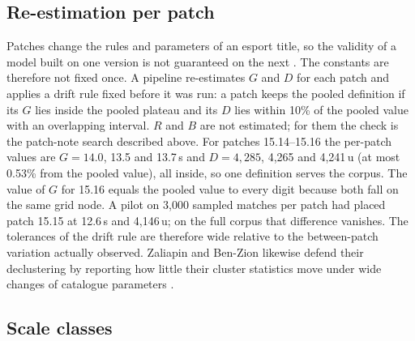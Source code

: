 \subsection{Re-estimation per patch}

Patches change the rules and parameters of an esport title, so the validity of a model built on one
version is not guaranteed on the next \cite{chitayat2023beyond}. The constants are therefore not fixed
once.
A pipeline re-estimates $G$ and $D$ for each patch and applies a drift rule fixed before it was run: a patch keeps the pooled definition if its
$G$ lies inside the pooled plateau and its $D$ lies within 10\% of the pooled value with an overlapping
interval.
$R$ and $B$ are not estimated; for them the check is the patch-note search described above. For patches
15.14--15.16 the per-patch values are $G = 14.0$, 13.5 and 13.7\,s and $D = 4{,}285$, 4,265 and
4,241\,u (at most 0.53\% from the pooled value), all inside, so one definition serves the corpus. The
value of $G$ for 15.16 equals the pooled value to every digit because both fall on the same grid node.
A pilot on 3,000 sampled matches per patch had placed patch 15.15 at 12.6\,s and 4,146\,u; on the full
corpus that difference vanishes. The tolerances of the drift rule are therefore wide relative to the
between-patch variation actually observed. Zaliapin and Ben-Zion likewise defend their declustering by
reporting how little their cluster statistics move under wide changes of catalogue parameters
\cite{zaliapin2022perspectives}.

\subsection{Scale classes}

